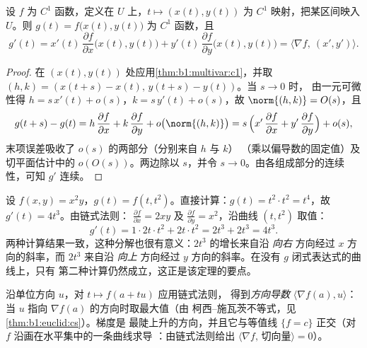 \begin{theorem}[链式法则]\label{thm:b1:multivar:chain}
设 $f$ 为 $C^1$ 函数，定义在 $U$ 上，$t \mapsto (x(t), y(t))$ 为
$C^1$ 映射，把某区间映入 $U$。则 $g(t) = f\bigl(x(t), y(t)\bigr)$
为 $C^1$ 函数，且
\[
g'(t) = x'(t)\,\frac{\partial f}{\partial x}\bigl(x(t),y(t)\bigr)
+ y'(t)\,\frac{\partial f}{\partial y}\bigl(x(t),y(t)\bigr)
= \bigl\langle \nabla f,\ (x', y')\bigr\rangle .
\]
\end{theorem}

\begin{proof}
在 $(x(t), y(t))$ 处应用\cref{thm:b1:multivar:c1}，并取 $(h, k) =
(x(t+s) - x(t),\, y(t+s) - y(t))$。当 $s \to 0$ 时，
由一元可微性得 $h = s\,x'(t) + o(s)$，$k = s\,y'(t)
+ o(s)$，故 $\norm{(h, k)} = O(s)$，且
\[
g(t+s) - g(t)
= h\,\frac{\partial f}{\partial x} + k\,\frac{\partial
f}{\partial y} + o\bigl(\norm{(h,k)}\bigr)
= s\,\Bigl(x'\,\frac{\partial f}{\partial x} +
y'\,\frac{\partial f}{\partial y}\Bigr) + o(s) ,
\]
末项误差吸收了 $o(s)$ 的两部分（分别来自 $h$ 与 $k$）
（乘以偏导数的固定值）及
切平面估计中的 $o(O(s))$。两边除以 $s$，并令
$s \to 0$。由各组成部分的连续性，可知 $g'$
连续。
\end{proof}

\begin{example}[链式法则的两种验证]
\label{ex:b1:multivar:chainrun}
设 $f(x, y) = x^2 y$，$g(t) = f(t, t^2)$。直接计算：$g(t) =
t^2\cdot t^2 = t^4$，故 $g'(t) = 4t^3$。由链式法则：
$\frac{\partial f}{\partial x} = 2xy$ 及 $\frac{\partial
f}{\partial y} = x^2$，沿曲线 $(t, t^2)$ 取值：
\[
g'(t) = 1\cdot 2t\cdot t^2 + 2t\cdot t^2 = 2t^3 + 2t^3 = 4t^3 .
\]
两种计算结果一致，这种分解也很有意义：$2t^3$
的增长来自沿 \emph{向右} 方向经过
$x$ 方向的斜率，而 $2t^3$ 来自沿 \emph{向上} 方向经过
$y$ 方向的斜率。在没有 $g$ 闭式表达式的曲线上，只有
第二种计算仍然成立，这正是该定理的要点。
\end{example}

\begin{remark}[梯度的解读]
沿单位方向 $u$，对 $t \mapsto f(a + tu)$ 应用链式法则，
得到\emph{方向导数} $\langle \nabla f(a),
u\rangle$：当 $u$ 指向 $\nabla f(a)$ 的方向时取最大值（由
柯西--施瓦茨不等式，见\cref{thm:b1:euclid:cs}）。梯度是
最陡上升的方向，并且它与等值线
$\{f = c\}$ 正交（对 $f$ 沿画在水平集中的一条曲线求导
：由链式法则给出 $\langle\nabla f,\,
\text{切向量}\rangle = 0$）。
\end{remark}

